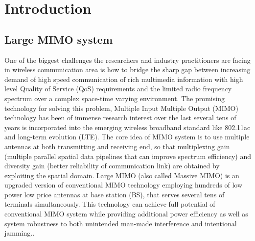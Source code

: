 \resetdatestamp







\chapter{Introduction}
\section{Large MIMO system}

  One of the biggest challenges the researchers and industry practitioners are facing in wireless communication area is how to bridge the sharp gap between increasing demand of high speed communication of rich multimedia information with high level Quality of Service (QoS) requirements and the limited radio frequency spectrum over a complex space-time varying environment. The promising technology for solving this problem, Multiple Input Multiple Output (MIMO) technology has been of immense research interest over the last several tens of years is incorporated into the emerging wireless broadband standard like 802.11ac\cite{IEEE802.11ac} and long-term evolution (LTE)\cite{3GLTE}.  The core idea of MIMO system is to use multiple antennas at both transmitting and receiving end, so that multiplexing gain (multiple parallel spatial data pipelines that can improve spectrum efficiency) and diversity gain (better reliability of communication link) are obtained by exploiting the spatial domain. Large MIMO (also called Massive MIMO) is an upgraded version of conventional MIMO technology employing hundreds of low power low price antennas at base station (BS), that serves several tens of terminals simultaneously. This technology can achieve full potential of conventional MIMO system while providing additional power efficiency as well as system robustness to both unintended man-made interference and intentional jamming.\cite{rusek2013scaling}\cite{larsson2014massive}. 
